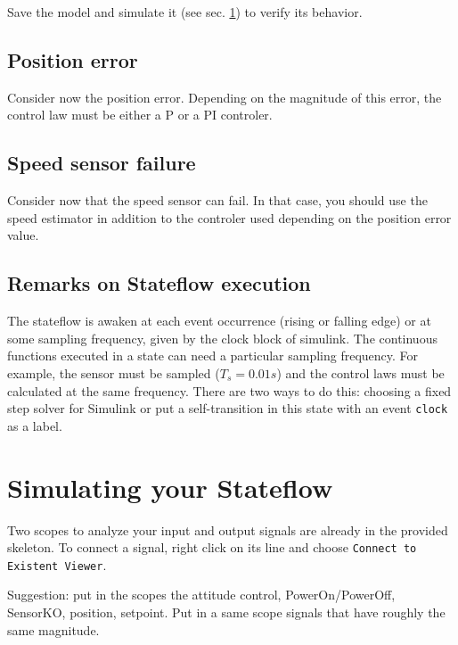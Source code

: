 \documentclass[a4paper]{article}
\begin{document}
Save the model and simulate it (see sec. \ref{simu}) to verify its behavior.

\subsection{Position error}
Consider now the position error. Depending on the magnitude of this error, the control law must
be either a P or a PI controler.

\subsection{Speed sensor failure}
Consider now that the speed sensor can fail. In that case, you should use the speed estimator
in addition to the controler used depending on the position error value.

\subsection{Remarks on Stateflow execution}

The stateflow is awaken at each event occurrence (rising or falling edge) or at some sampling 
frequency, given by the clock block of simulink. The continuous functions executed in a state can 
need a particular sampling frequency. For example, the sensor must be sampled ($T_s=0.01s$) and the 
control laws must be calculated at the same frequency. There are two ways to do this: choosing a 
fixed step solver for Simulink or put a self-transition in this state with an event \texttt{clock} 
as a label.

\section{Simulating your Stateflow}
\label{simu}

Two scopes to analyze your input and output signals are already in the provided skeleton.
To connect a signal, right click on its line and choose {\tt Connect to Existent Viewer}.

Suggestion: put in the scopes the attitude control, PowerOn/PowerOff, SensorKO, position, setpoint. 
Put in a same scope signals that have roughly the same magnitude.\\
\end{document}
